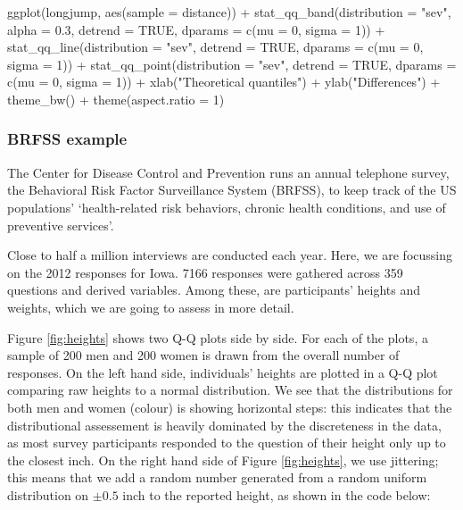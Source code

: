 \begin{Schunk}
\begin{Sinput}
ggplot(longjump, aes(sample = distance)) +
  stat_qq_band(distribution = "sev", alpha = 0.3, detrend = TRUE, dparams = c(mu = 0, sigma = 1)) +
  stat_qq_line(distribution = "sev", detrend = TRUE, dparams = c(mu = 0, sigma = 1)) +
  stat_qq_point(distribution = "sev", detrend = TRUE, dparams = c(mu = 0, sigma = 1)) +
  xlab("Theoretical quantiles") +
  ylab("Differences") +
  theme_bw() +
  theme(aspect.ratio = 1)
\end{Sinput}
\end{Schunk}

\FloatBarrier

\subsubsection{BRFSS example}\label{brfss-example}

\label{sec:brfss}

The Center for Disease Control and Prevention runs an annual telephone
survey, the Behavioral Risk Factor Surveillance System (BRFSS), to keep
track of the US populations' `health-related risk behaviors, chronic
health conditions, and use of preventive services'.

Close to half a million interviews are conducted each year. Here, we are
focussing on the 2012 responses for Iowa. 7166 responses were gathered
across 359 questions and derived variables. Among these, are
participants' heights and weights, which we are going to assess in more
detail.

Figure \ref{fig:heights} shows two Q-Q plots side by side. For each of
the plots, a sample of 200 men and 200 women is drawn from the overall
number of responses. On the left hand side, individuals' heights are
plotted in a Q-Q plot comparing raw heights to a normal distribution. We
see that the distributions for both men and women (colour) is showing
horizontal steps: this indicates that the distributional assessement is
heavily dominated by the discreteness in the data, as most survey
participants responded to the question of their height only up to the
closest inch. On the right hand side of Figure \ref{fig:heights}, we use
jittering; this means that we add a random number generated from a
random uniform distribution on \(\pm 0.5\) inch to the reported height,
as shown in the code below:

